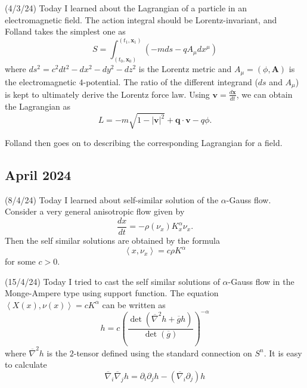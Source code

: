 \documentclass[12pt,a4paper]{article}
\begin{document}
(4/3/24) Today I learned about the Lagrangian of a particle in an electromagnetic field. The action integral should be Lorentz-invariant, and Folland takes the simplest one as 
\[ S = \int_{(t_{0},\textbf{x}_{0} )}^{(t_{1},\textbf{x}_{1} )}(-m ds - qA_{\mu}dx^{\mu}) \]
where $ ds^{2} = c^{2}dt^{2}-dx^{2}-dy^{2}-dz^{2} $ is the Lorentz metric and $ A_{\mu} = (\phi, \textbf{A} ) $ is the electromagnetic $ 4 $-potential. The ratio of the different integrand ($ ds $ and $ A_{\mu} $) is kept to ultimately derive the Lorentz force law. Using $ \textbf{v} = \frac{d \textbf{x} }{dt}  $, we can obtain the Lagrangian as 
\[ L = -m\sqrt{1-|\textbf{v}|^{2}}+ \textbf{q}\cdot \textbf{v}-q \phi .  \]

Folland then goes on to describing the corresponding Lagrangian for a field.


\subsection*{April 2024}
\quad(8/4/24) Today I learned about self-similar solution of the $ \alpha $-Gauss flow. Consider a very general anisotropic flow given by
\[ \frac{dx}{dt} = - \rho(\nu_{x})K^{\alpha}_{x}\nu_{x}. \]
Then the self similar solutions are obtained by the formula 
\[ \left< x,\nu_{x} \right> = c\rho K^{\alpha} \]
for some $ c>0 $.

(15/4/24) Today I tried to cast the self similar solutions of $ \alpha $-Gauss flow in the Monge-Ampere type using support function. The equation $ \left< X(x), \nu(x) \right> = cK^{\alpha} $ can be written as 
\[ h = c \left(\frac{\det(\overline{\nabla}^{2}h+\overline{g}h)}{\det(\overline{g})}\right)^{- \alpha} \]
where $ \overline{\nabla}^{2}h $ is the $ 2 $-tensor defined using the standard connection on $ S^{n} $. It is easy to calculate
\[ \overline{\nabla}_{i}\overline{\nabla}_{j}h = \partial_{i}\partial_{j}h- (\overline{\nabla}_{i}\partial_{j})h \]
\end{document}
